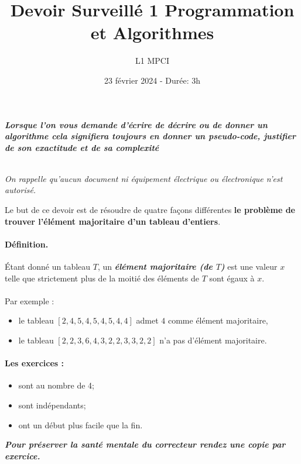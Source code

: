 \documentclass{article}
\title{Devoir Surveillé 1 Programmation et Algorithmes}
\author{L1 MPCI}
\date{23 février 2024 - Durée: 3h}
\theoremstyle{exostyle}
\theoremstyle{partiestyle}
\theoremstyle{questionstyle}
\begin{document}
\maketitle

\begin{center}
{\em\bf Lorsque l'on vous demande d'écrire de décrire ou de donner un algorithme cela signifiera toujours en donner un pseudo-code, justifier de son exactitude et de sa complexité}

~\\

{\em On rappelle qu'aucun document ni équipement électrique ou électronique n'est autorisé. }
\end{center}

\vspace*{1cm}
Le but de ce devoir est de résoudre de quatre façons différentes {\bf le problème de trouver l'élément majoritaire d'un tableau d'entiers}.

\paragraph*{Définition.}Étant donné un tableau $T$, un {\it\bf élément majoritaire (de $T$)} est une valeur $x$ telle que strictement plus de la moitié des éléments de $T$ sont égaux à $x$.

\paragraph*{}Par exemple :
\begin{itemize}
    \item le tableau $[2,4,5,4,5,4, 5, 4, 4]$ admet $4$ comme élément majoritaire,
    \item le tableau $[2,2,3,6,4,3,2,2,3,3,2,2]$ n'a pas d'élément majoritaire. 
\end{itemize}
    

\paragraph*{Les exercices :}
\begin{itemize}
\item sont au nombre de 4;
\item sont indépendants;
\item ont un début plus facile que la fin.
\end{itemize}

\vspace*{2cm}
\begin{center}
    {\em\bf\sc\Large Pour préserver la santé mentale du correcteur rendez une copie par exercice.}
    
\end{center}
\end{document}

